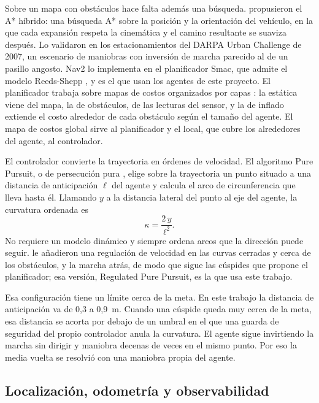 Sobre un mapa con obstáculos hace falta además una búsqueda.
\textcite{dolgov2010path} propusieron el A* híbrido: una búsqueda A* sobre la
posición y la orientación del vehículo, en la que cada expansión respeta la
cinemática y el camino resultante se suaviza después. Lo validaron en los
estacionamientos del DARPA Urban Challenge de 2007, un escenario de maniobras con
inversión de marcha parecido al de un pasillo angosto. Nav2 lo implementa en el
planificador Smac, que admite el modelo Reeds-Shepp \autocite{macenski2024smac},
y es el que usan los agentes de este proyecto. El planificador trabaja sobre
mapas de costos organizados por capas \autocite{lu2014layered}: la estática viene
del mapa, la de obstáculos, de las lecturas del sensor, y la de inflado extiende
el costo alrededor de cada obstáculo según el tamaño del agente. El mapa de
costos global sirve al planificador y el local, que cubre los alrededores del
agente, al controlador.

El controlador convierte la trayectoria en órdenes de velocidad. El algoritmo Pure Pursuit, o de persecución pura \autocite{coulter1992implementation}, elige sobre la trayectoria un punto
situado a una distancia de anticipación $\ell$ del agente y calcula el arco de
circunferencia que lleva hasta él. Llamando $y$ a la distancia lateral del punto
al eje del agente, la curvatura ordenada es
\begin{equation}
  \kappa = \frac{2\,y}{\ell^{2}} .
\end{equation}
No requiere un modelo dinámico y siempre ordena arcos que la dirección puede
seguir. \textcite{macenski2023rpp} le añadieron una regulación de velocidad en
las curvas cerradas y cerca de los obstáculos, y la marcha atrás, de modo que sigue las cúspides que propone el planificador; esa versión, Regulated Pure Pursuit, es la que usa este trabajo.

Esa configuración tiene un límite cerca de la meta. En este trabajo la distancia
de anticipación va de 0,3 a 0,9~m. Cuando una cúspide queda muy cerca de la
meta, esa distancia se acorta por debajo de un umbral en el que una guarda de seguridad del
propio controlador anula la curvatura. El agente sigue invirtiendo la marcha
sin dirigir y maniobra decenas de veces en el mismo punto. Por eso la media
vuelta se resolvió con una maniobra propia del agente.

\subsection{Localización, odometría y observabilidad}
\label{sec:teo-localizacion}

